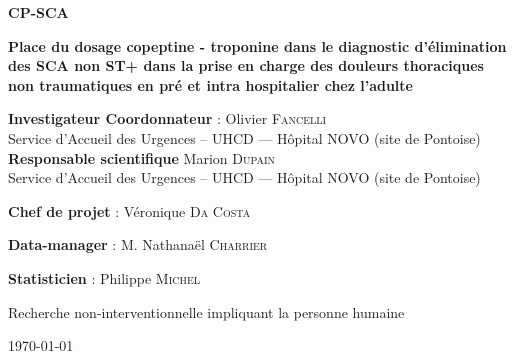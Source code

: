 %
\raggedright
\thispagestyle{empty}

\begin{tcolorbox}[colback=novo!5,
                  colframe=novo]
\begin{center}
\textbf{\textcolor{novo}{\Huge CP-SCA}}
\end{center}
\end{tcolorbox}


\bigskip
\begin{center}
\textbf{\Large Place du dosage copeptine - troponine dans le diagnostic d’élimination des SCA non ST+ dans la prise en charge des douleurs thoraciques non traumatiques en pré et intra hospitalier chez l’adulte}
\end{center}




\begin{center}
\begin{minipage}{0.8\textwidth}
\begin{tcolorbox}[colback=novo!5,
                  colframe=novo]
\textbf{Investigateur Coordonnateur} :   \doc Olivier \textsc{Fancelli}\\ Service d’Accueil des Urgences – UHCD --- Hôpital NOVO (site de Pontoise)\\

\textbf{Responsable scientifique} \mme Marion \textsc{Dupain}\\ Service d’Accueil des Urgences – UHCD --- Hôpital NOVO (site de Pontoise)\\


\bigskip

\textbf{Chef de projet} : \mme Véronique \textsc{Da Costa}
\bigskip

\textbf{Data-manager} : M. Nathanaël \textsc{Charrier}
\bigskip

\textbf{Statisticien} : \doc Philippe \textsc{Michel}

\end{tcolorbox}
\end{minipage}
\end{center}



Recherche non-interventionnelle impliquant la personne humaine


\begin{flushright}
\today
\end{flushright}
